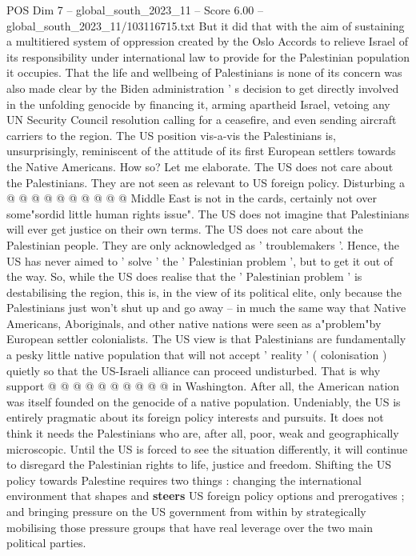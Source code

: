 \begin{textsample}{POS Dim 7 – global\_south\_2023\_11 – Score 6.00 – global\_south\_2023\_11/103116715.txt}
But it did that with the aim of sustaining a multitiered system of oppression created by the Oslo Accords to relieve Israel of its responsibility under international law to provide for the Palestinian population it occupies.
That the life and wellbeing of Palestinians is none of its concern was also made clear by the Biden administration ' s decision to get directly involved in the unfolding genocide by financing it, arming apartheid Israel, vetoing any UN Security Council resolution calling for a ceasefire, and even sending aircraft carriers to the region.
The US position vis-a-vis the Palestinians is, unsurprisingly, reminiscent of the attitude of its first European settlers towards the Native Americans.
How so?
Let me elaborate.
The US does not care about the Palestinians.
They are not seen as relevant to US foreign policy.
Disturbing a @ @ @ @ @ @ @ @ @ @ Middle East is not in the cards, certainly not over some"sordid little human rights issue".
The US does not imagine that Palestinians will ever get justice on their own terms.
The US does not care about the Palestinian people.
They are only acknowledged as ' troublemakers '.
Hence, the US has never aimed to ' solve ' the ' Palestinian problem ', but to get it out of the way.
So, while the US does realise that the ' Palestinian problem ' is destabilising the region, this is, in the view of its political elite, only because the Palestinians just won't shut up and go away -- in much the same way that Native Americans, Aboriginals, and other native nations were seen as a"problem"by European settler colonialists.
The US view is that Palestinians are fundamentally a pesky little native population that will not accept ' reality ' ( colonisation ) quietly so that the US-Israeli alliance can proceed undisturbed.
That is why support @ @ @ @ @ @ @ @ @ @ in Washington.
After all, the American nation was itself founded on the genocide of a native population.
Undeniably, the US is entirely pragmatic about its foreign policy interests and pursuits.
It does not think it needs the Palestinians who are, after all, poor, weak and geographically microscopic.
Until the US is forced to see the situation differently, it will continue to disregard the Palestinian rights to life, justice and freedom.
Shifting the US policy towards Palestine requires two things : changing the international environment that shapes and \textbf{steers} US foreign policy options and prerogatives ; and bringing pressure on the US government from within by strategically mobilising those pressure groups that have real leverage over the two main political parties.

\end{textsample}
